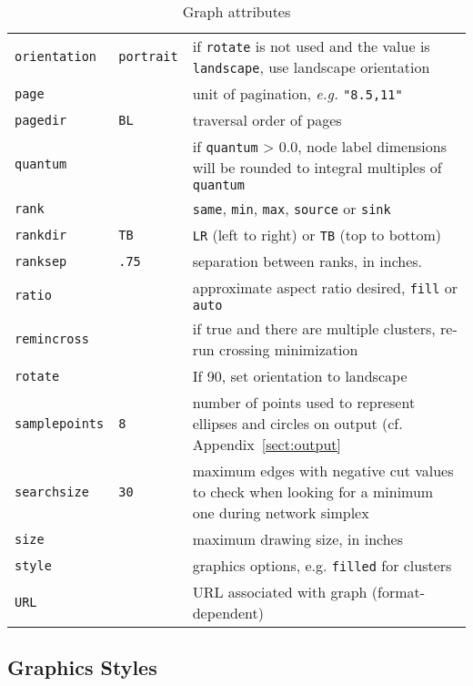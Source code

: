 \documentclass[11pt]{article}
\begin{document}
\begin{table}[p]
\begin{tabular}[t]{|l|l|p{3.5in}|}
{\tt orientation} & {\tt portrait} & if {\tt rotate} is not used and the value
is {\tt landscape}, use landscape orientation \\
{\tt page} & & unit of pagination, {\it e.g.} {\tt "8.5,11"} \\
{\tt pagedir} & {\tt BL} & traversal order of pages \\
{\tt quantum} &  & if {\tt quantum} > 0.0, node label dimensions will be 
rounded to integral multiples of {\tt quantum} \\
{\tt rank} & & {\tt same}, {\tt min}, {\tt max}, {\tt source} or {\tt sink} \\
{\tt rankdir} & {\tt TB} & {\tt LR} (left to right) or {\tt TB} (top to bottom) \\
{\tt ranksep} & {\tt .75} & separation between ranks, in inches. \\
{\tt ratio} & & approximate aspect ratio desired, {\tt fill} or {\tt auto} \\
{\tt remincross} & & if true and there are multiple clusters, re-run crossing
minimization \\
{\tt rotate} & & If 90, set orientation to landscape \\
{\tt samplepoints} & {\tt 8} & number of points used to represent ellipses
and circles on output (cf.  Appendix~\ref{sect:output} \\
{\tt searchsize} & {\tt 30} & maximum edges with negative cut values to
check when looking for a minimum one during network simplex \\
{\tt size} & & maximum drawing size, in inches \\
{\tt style} & & graphics options, e.g. {\tt filled} for clusters \\
{\tt URL} & & URL associated with graph (format-dependent) \\
\hline
\end{tabular}
\caption{Graph attributes}
\label{tab:gattr}
\end{table}

\subsection{Graphics Styles}
\label{sect:style}
\end{document}
